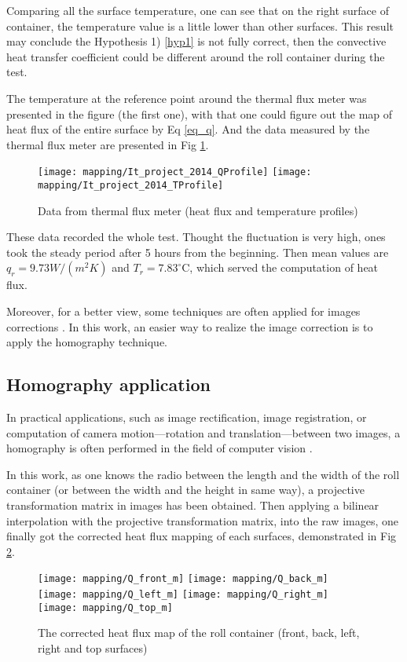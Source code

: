 Comparing all the surface temperature, one can see that on the right surface of container, the temperature value is a little lower than other surfaces. This result may conclude the Hypothesis 1) \ref{hyp1} is not fully correct, then the convective heat transfer coefficient could be different around the roll container during the test.

The temperature at the reference point around the thermal flux meter was presented in the figure (the first one), with that one could figure out the map of heat flux of the entire surface by Eq \ref{eq_q}. And the data measured by the thermal flux meter are presented in Fig \ref{flux_meter}.
\begin{figure}[!htbp]
	\centering
	\texttt{[image: mapping/It\_project\_2014\_QProfile]}
	\texttt{[image: mapping/It\_project\_2014\_TProfile]}
	\caption{Data from thermal flux meter (heat flux and temperature profiles)}
	\label{flux_meter}
\end{figure}
These data recorded the whole test. Thought the fluctuation is very high, ones took the steady period after 5 hours from the beginning. Then mean values are $q_r=9.73 W/(m^2 K)$ and $T_r = 7.83 ^\circ$C, which served the computation of heat flux.

Moreover, for a better view, some techniques are often applied for images corrections \citep{bison2012geometrical}. In this work, an easier way to realize the image correction is to apply the homography technique.

\subsection{Homography application}
In practical applications, such as image rectification, image registration, or computation of camera motion—rotation and translation—between two images, a homography is often performed in the field of computer vision \citep{homo_wiki}.

In this work, as one knows the radio between the length and the width of the roll container (or between the width and the height in same way), a projective transformation matrix in images has been obtained. Then applying a bilinear interpolation with the projective transformation matrix, into the raw images, one finally got the corrected heat flux mapping of each surfaces, demonstrated in Fig \ref{Q_box}.
\begin{figure}[!htbp]
	\centering
	\texttt{[image: mapping/Q\_front\_m]}
	\hspace{5pt}
	\texttt{[image: mapping/Q\_back\_m]}
	\texttt{[image: mapping/Q\_left\_m]}
	\hspace{5pt}
	\texttt{[image: mapping/Q\_right\_m]}
	\texttt{[image: mapping/Q\_top\_m]}
	\caption{The corrected heat flux map of the roll container (front,  back, left, right and top surfaces)}
	\label{Q_box}
\end{figure}

